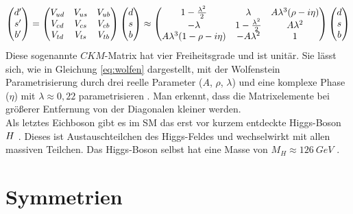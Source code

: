 \begin{equation}
\begin{pmatrix}{\ensuremath{d}}'\\ {s}'\\ {b}'\end{pmatrix}=\begin{pmatrix}{\ensuremath{V_{{u}{d}}}} & {V_{{u}{s}}} & {V_{{u}{b}}}\\ {V_{{c}{d}}} & {V_{{c}{s}}} & {V_{{c}{b}}}\\ {V_{{t}{d}}} & {V_{{t}{s}}} & {V_{{t}{b}}}\end{pmatrix}\begin{pmatrix}{\ensuremath{d}}\\ {s}\\ {b}\end{pmatrix}\approx\begin{pmatrix}1-\frac{\lambda^2}{2} & \lambda & A\lambda^3(\rho-i\eta)\\-\lambda & 1-\frac{\lambda^2}{2} & A\lambda^2\\A\lambda^3(1-\rho-i\eta) & -A\lambda^2 & 1\end{pmatrix}\begin{pmatrix}{\ensuremath{d}}\\ {s}\\ {b}\end{pmatrix}\label{eq:wolfen}
\end{equation}
Diese sogenannte $C\!K\!M$-Matrix hat vier Freiheitsgrade und ist unitär. Sie lässt sich, wie in Gleichung \eqref{eq:wolfen} dargestellt, mit der Wolfenstein Parametrisierung durch drei reelle Parameter ($A$, $\rho$, $\lambda$) und eine komplexe Phase ($\eta$) mit $\lambda\approx0{,}22$ parametrisieren \cite{ckm_param}. Man erkennt, dass die Matrixelemente bei größerer Entfernung von der Diagonalen kleiner werden.\\ 
Als letztes Eichboson gibt es im SM das erst vor kurzem entdeckte Higgs-Boson $H$ \cite{higgs_found,higgs_atlas}. Dieses ist Austauschteilchen des Higgs-Feldes und wechselwirkt mit allen massiven Teilchen. Das Higgs-Boson selbst hat eine Masse von $M_H\approx\SI{126}{GeV}$ \cite{PDG-2012}. 

\section{Symmetrien}\label{sec:disksym}

